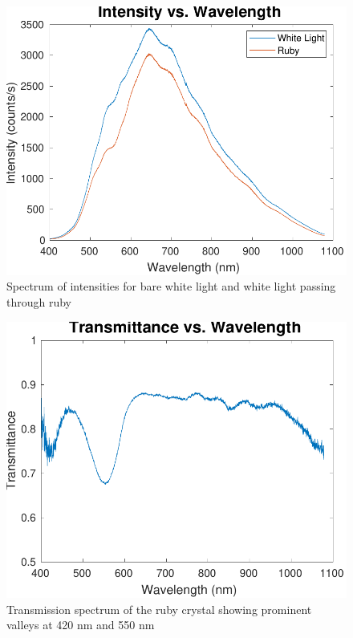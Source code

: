 \documentclass[11pt, a4paper, twocolumn]{article}
\begin{document}
\begin{figure}[H]
\includegraphics[width=\linewidth]{doubleIntensityMeasurement.pdf}
\caption{Spectrum of intensities for bare white light and white light passing through ruby
}
\label{fig:intensities}
\end{figure}

\begin{figure}[H]
\includegraphics[width=\linewidth]{transmissionSpectrum.pdf}
\caption{Transmission spectrum of the ruby crystal showing prominent valleys at 420 nm and 550 nm}
\label{fig:intensities}
\end{figure}
\end{document}

